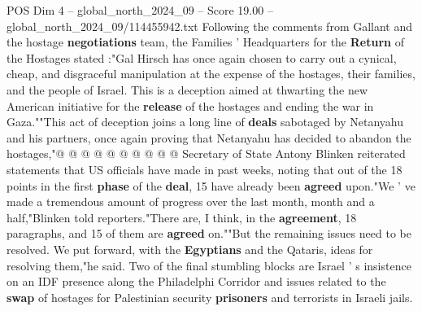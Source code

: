 \begin{textsample}{POS Dim 4 – global\_north\_2024\_09 – Score 19.00 – global\_north\_2024\_09/114455942.txt}
Following the comments from Gallant and the hostage \textbf{negotiations} team, the Families ' Headquarters for the \textbf{Return} of the Hostages stated :"Gal Hirsch has once again chosen to carry out a cynical, cheap, and disgraceful manipulation at the expense of the hostages, their families, and the people of Israel.
This is a deception aimed at thwarting the new American initiative for the \textbf{release} of the hostages and ending the war in Gaza.""This act of deception joins a long line of \textbf{deals} sabotaged by Netanyahu and his partners, once again proving that Netanyahu has decided to abandon the hostages,"@ @ @ @ @ @ @ @ @ @ Secretary of State Antony Blinken reiterated statements that US officials have made in past weeks, noting that out of the 18 points in the first \textbf{phase} of the \textbf{deal}, 15 have already been \textbf{agreed} upon."We ' ve made a tremendous amount of progress over the last month, month and a half,"Blinken told reporters."There are, I think, in the \textbf{agreement}, 18 paragraphs, and 15 of them are \textbf{agreed} on.""But the remaining issues need to be resolved.
We put forward, with the \textbf{Egyptians} and the Qataris, ideas for resolving them,"he said.
Two of the final stumbling blocks are Israel ' s insistence on an IDF presence along the Philadelphi Corridor and issues related to the \textbf{swap} of hostages for Palestinian security \textbf{prisoners} and terrorists in Israeli jails.

\end{textsample}
